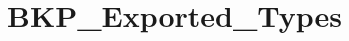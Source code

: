 \hypertarget{group__BKP__Exported__Types}{
\section{BKP\_\-Exported\_\-Types}
\label{group__BKP__Exported__Types}
}
